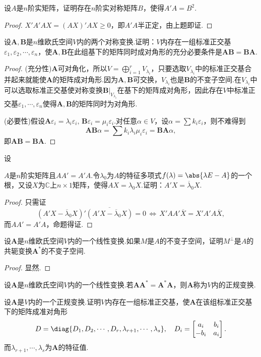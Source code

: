 \begin{prob}[23]
	设$A$是$n$阶实矩阵，证明存在$n$阶实对称矩阵$B$，使得$A'A=B^2$.
\end{prob}
\begin{proof}
	$X'A'AX=(AX)'AX\ge 0$，即$A'A$半正定，由上题即证.
\end{proof}
\begin{prob}[24]
	设$\bm A,\bm B$是$n$维欧氏空间$V$内的两个对称变换.证明：$V$内存在一组标准正交基$\varepsilon_1,\varepsilon_2,\cdots,\varepsilon_n$，使$\bm A,\bm B$在此组基下的矩阵同时成对角形的充分必要条件是$\bm{AB}=\bm{BA}$.
\end{prob}
\begin{proof}
	(充分性)$\bm A$可对角化，所以$V=\displaystyle\bigoplus_{i=1}^rV_{\lambda_i}$，只要选取$V_{\lambda_i}$中的标准正交基合并起来就能使$\bm A$的矩阵成对角形.因为$\bm A,\bm B$可交换，$V_{\lambda_i}$也是$\bm B$的不变子空间.在$V_{\lambda_i}$中可以选取标准正交基使对称变换$\bm B|_{V_{\lambda_i}}$在基下的矩阵成对角形，因此存在$V$中标准正交基$\varepsilon_1,\cdots,\varepsilon_n$使得$\bm A,\bm B$的矩阵同时为对角形.

	(必要性)假设$\bm A\varepsilon_i=\lambda_i\varepsilon_i,\,\bm B\varepsilon_i=\mu_i\varepsilon_i$.对任意$\alpha\in V$，设$\alpha=\sum k_i\varepsilon_i$，则不难得到
	\[
		\bm{AB}\alpha=\sum k_i\lambda_i\mu_i\varepsilon_i=\bm{BA}\alpha,
	\]
	即$\bm{AB}=\bm{BA}$.
\end{proof}
\begin{prob}[25]
	\hypertarget{LemmaOfNormalTransformation}{设}$A$是$n$阶实矩阵且$AA'=A'A$.令$\lambda_0$为$A$的特征多项式$f(\lambda)=\abs{\lambda E-A}$的一个根，又设$X$为$\mathbb{C}$上$n\times 1$矩阵，使得$AX=\lambda_0X$.证明：$A'X=\overline{\lambda}_0X$.
\end{prob}
\begin{proof}
	只需证
	\[
		(A'X-\overline{\lambda}_0X)'\overline{(A'X-\overline{\lambda}_0X)}=0\,\Leftrightarrow\,X'AA'\overline{X}=X'A'A\overline{X},
	\]
	而$AA'=A'A$，命题得证.
\end{proof}
\begin{prob}[26]
	设$\bm A$是$n$维欧氏空间$V$内的一个线性变换.如果$M$是$A$的不变子空间，证明$M^\perp$是$A$的共轭变换$\bm A^*$的不变子空间.
\end{prob}
\begin{proof}
	显然.
\end{proof}
\begin{prob}[27]
	设$\bm A$是$n$维欧氏空间$V$内的一个线性变换.若$\bm A\bm A^*=\bm A^*\bm A$，则$\bm A$称为$V$内的{\heiti 正规变换}.

	设$\bm A$是$V$内的一个正规变换.证明$V$内存在一组标准正交基，使$\bm A$在该组标准正交基下的矩阵成准对角形
	\[
		D=\diag{D_1,D_2,\cdots,D_r,\lambda_{r+1},\cdots,\lambda_s},\quad D_i=\begin{bmatrix}
			a_i  & b_i \\
			-b_i & a_i
		\end{bmatrix}.
	\]
	而$\lambda_{r+1},\cdots,\lambda_s$为$\bm A$的特征值.
\end{prob}
